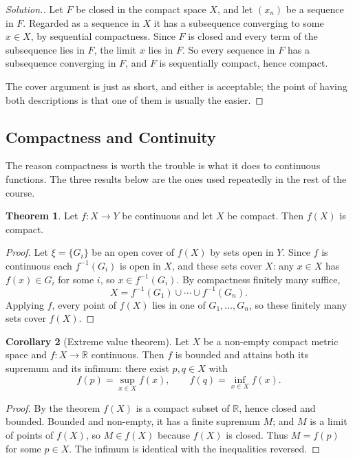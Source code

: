 \documentclass[11pt,a4paper]{article}
\theoremstyle{definition}
\newtheorem{thm}{Theorem}[section]
\newtheorem{coro}[thm]{Corollary}
\newenvironment{solution}
  {\renewcommand{\qedsymbol}{}\begin{proof}[\textit{Solution}.]}
  {\end{proof}}
\begin{document}
\begin{solution}
Let $F$ be closed in the compact space $X$, and let $(x_n)$ be a sequence in
$F$. Regarded as a sequence in $X$ it has a subsequence converging to some
$x\in X$, by sequential compactness. Since $F$ is closed and every term of the
subsequence lies in $F$, the limit $x$ lies in $F$. So every sequence in $F$ has
a subsequence converging in $F$, and $F$ is sequentially compact, hence compact.

The cover argument is just as short, and either is acceptable; the point of
having both descriptions is that one of them is usually the easier.
\end{solution}

\pagebreak

\subsection{Compactness and Continuity}

The reason compactness is worth the trouble is what it does to continuous
functions. The three results below are the ones used repeatedly in the rest of
the course.

\begin{thm}
Let $f:X\rightarrow Y$ be continuous and let $X$ be compact. Then $f(X)$ is
compact.
\end{thm}

\begin{proof}
Let $\xi=\{G_i\}$ be an open cover of $f(X)$ by sets open in $Y$. Since $f$ is
continuous each $f^{-1}(G_i)$ is open in $X$, and these sets cover $X$: any
$x\in X$ has $f(x)\in G_i$ for some $i$, so $x\in f^{-1}(G_i)$. By compactness
finitely many suffice,
$$X = f^{-1}(G_1)\cup\cdots\cup f^{-1}(G_n) .$$
Applying $f$, every point of $f(X)$ lies in one of $G_1,\dots,G_n$, so these
finitely many sets cover $f(X)$.
\end{proof}

\begin{coro}[Extreme value theorem]
Let $X$ be a non-empty compact metric space and $f:X\rightarrow\mathbb{R}$
continuous. Then $f$ is bounded and attains both its supremum and its infimum:
there exist $p,q\in X$ with
$$f(p) = \sup_{x\in X}f(x),\qquad f(q) = \inf_{x\in X}f(x).$$
\end{coro}

\begin{proof}
By the theorem $f(X)$ is a compact subset of $\mathbb{R}$, hence closed and
bounded. Bounded and non-empty, it has a finite supremum $M$; and $M$ is a limit
of points of $f(X)$, so $M\in f(X)$ because $f(X)$ is closed. Thus $M=f(p)$ for
some $p\in X$. The infimum is identical with the inequalities reversed.
\end{proof}
\end{document}
